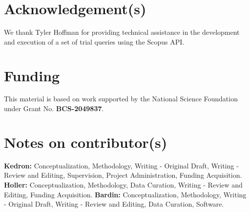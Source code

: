 \documentclass[]{interact}
\theoremstyle{plain}%
\theoremstyle{definition}
\theoremstyle{remark}
\begin{document}
\section*{Acknowledgement(s)}
We thank Tyler Hoffman for providing technical assistance in the development and execution of a set of trial queries using the Scopus API.

\section*{Funding}
This material is based on work supported by the National Science Foundation under Grant No. \textbf{BCS-2049837}.

\section*{Notes on contributor(s)}
\textbf{Kedron:} Conceptualization, Methodology, Writing - Original Draft, Writing - Review and Editing, Supervision, Project Administration, Funding Acquisition. \textbf{Holler:} Conceptualization, Methodology, Data Curation, Writing - Review and Editing, Funding Acquisition. \textbf{Bardin:} Conceptualization, Methodology, Writing - Original Draft, Writing - Review and Editing, Data Curation, Software.

\newpage

\end{document}
